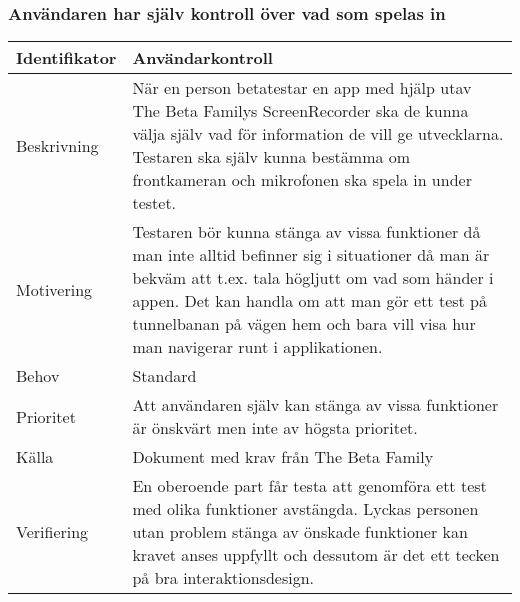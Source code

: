 \subsubsection{Användaren har själv kontroll över vad som spelas in}
\begin{tabular}{ | p{65pt} | p{300pt} |}
  \hline
  Identifikator &
  Användarkontroll
  \\ \hline
  Beskrivning & 
  När en person betatestar en app med hjälp utav The Beta Familys ScreenRecorder ska de kunna välja själv vad för information de vill ge utvecklarna. Testaren ska själv kunna bestämma om frontkameran och mikrofonen ska spela in under testet. 
  \\ \hline
  Motivering &
  Testaren bör kunna stänga av vissa funktioner då man inte alltid befinner sig i situationer då man är bekväm att t.ex. tala högljutt om vad som händer i appen. Det kan handla om att man gör ett test på tunnelbanan på vägen hem och bara vill visa hur man navigerar runt i applikationen.
  \\ \hline
  Behov &
  Standard
  \\ \hline
  Prioritet &
  Att användaren själv kan stänga av vissa funktioner är önskvärt men inte av högsta prioritet.
  \\ \hline
  Källa &
  Dokument med krav från The Beta Family
  \\ \hline
  Verifiering &
  En oberoende part får testa att genomföra ett test med olika funktioner avstängda. Lyckas personen utan problem stänga av önskade funktioner kan kravet anses uppfyllt och dessutom är det ett tecken på bra interaktionsdesign.
  \\ \hline
\end{tabular}

